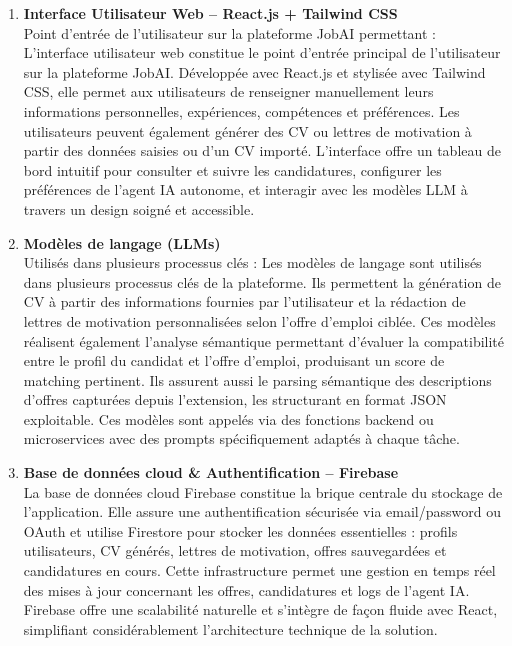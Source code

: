 \begin{enumerate}
    \item \textbf{Interface Utilisateur Web – React.js + Tailwind CSS} \\
    Point d'entrée de l'utilisateur sur la plateforme JobAI permettant :\\
L'interface utilisateur web constitue le point d'entrée principal de l'utilisateur sur la plateforme JobAI. Développée avec React.js et stylisée avec Tailwind CSS, elle permet aux utilisateurs de renseigner manuellement leurs informations personnelles, expériences, compétences et préférences. Les utilisateurs peuvent également générer des CV ou lettres de motivation à partir des données saisies ou d'un CV importé. L'interface offre un tableau de bord intuitif pour consulter et suivre les candidatures, configurer les préférences de l'agent IA autonome, et interagir avec les modèles LLM à travers un design soigné et accessible.

    \item \textbf{Modèles de langage (LLMs)} \\
    Utilisés dans plusieurs processus clés :
Les modèles de langage sont utilisés dans plusieurs processus clés de la plateforme. Ils permettent la génération de CV à partir des informations fournies par l'utilisateur et la rédaction de lettres de motivation personnalisées selon l'offre d'emploi ciblée. Ces modèles réalisent également l'analyse sémantique permettant d'évaluer la compatibilité entre le profil du candidat et l'offre d'emploi, produisant un score de matching pertinent. Ils assurent aussi le parsing sémantique des descriptions d'offres capturées depuis l'extension, les structurant en format JSON exploitable. Ces modèles sont appelés via des fonctions backend ou microservices avec des prompts spécifiquement adaptés à chaque tâche.


    \item \textbf{Base de données cloud \& Authentification – Firebase} \\
    La base de données cloud Firebase constitue la brique centrale du stockage de l'application. Elle assure une authentification sécurisée via email/password ou OAuth et utilise Firestore pour stocker les données essentielles : profils utilisateurs, CV générés, lettres de motivation, offres sauvegardées et candidatures en cours. Cette infrastructure permet une gestion en temps réel des mises à jour concernant les offres, candidatures et logs de l'agent IA. Firebase offre une scalabilité naturelle et s'intègre de façon fluide avec React, simplifiant considérablement l'architecture technique de la solution.\\


\end{enumerate}
